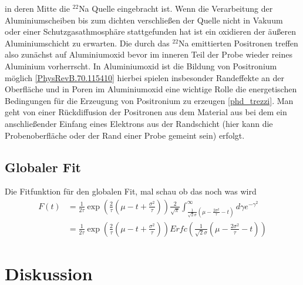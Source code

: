\documentclass[a4paper,12pt]{article}
\begin{document}
		in deren Mitte die $^{22}$Na Quelle eingebracht ist. Wenn die Verarbeitung der Aluminiumscheiben bis zum dichten verschließen der Quelle nicht
		in Vakuum oder einer Schutzgasathmosphäre stattgefunden hat ist ein oxidieren der äußeren Aluminiumschicht zu erwarten. Die durch das $^{22}$Na
		emittierten Positronen treffen also zunächst auf Aluminiumoxid bevor im inneren Teil der Probe wieder reines Aluminium vorherrscht. In Aluminiumoxid
		ist die Bildung von Positronium möglich \ref{PhysRevB.70.115410} hierbei spielen insbesonder Randeffekte an der Oberfläche und in Poren im 
		Aluminiumoxid eine wichtige Rolle die energetischen Bedingungen für die Erzeugung von Positronium zu erzeugen \ref{phd_trezzi}. Man geht von 
		einer Rückdiffusion der Positronen aus dem Material aus bei dem ein anschließender Einfang eines Elektrons aus der Randschicht 
		(hier kann die Probenoberfläche oder der Rand einer Probe gemeint sein) erfolgt.  
	
\subsection{Globaler Fit}
Die Fitfunktion für den globalen Fit, mal schau ob das noch was wird
\begin{align*}
	F(t) &= \frac{1}{2τ} \exp\left( \frac{2}{τ}\left( μ-t+\frac{σ^2}{τ} \right) \right) \frac{2}{\sqrt{π}}\int_{\frac{1}{\sqrt{2}σ}\left( μ-\frac{2σ^2}{τ} -t \right)}^\infty dγ e^{-γ^2}\\
	&= \frac{1}{2τ} \exp\left( \frac{2}{τ}\left( μ-t+\frac{σ^2}{τ} \right) \right) Erfc\left(\frac{1}{\sqrt{2}σ}\left( μ-\frac{2σ^2}{τ} -t \right)\right)
\end{align*}
\section{Diskussion}

 

{}
\end{document}
